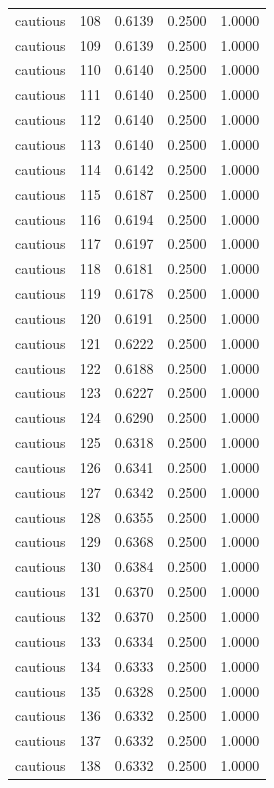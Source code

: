 \begin{tabular}{lrrrr}
cautious & 108 & 0.6139 & 0.2500 & 1.0000 \\
cautious & 109 & 0.6139 & 0.2500 & 1.0000 \\
cautious & 110 & 0.6140 & 0.2500 & 1.0000 \\
cautious & 111 & 0.6140 & 0.2500 & 1.0000 \\
cautious & 112 & 0.6140 & 0.2500 & 1.0000 \\
cautious & 113 & 0.6140 & 0.2500 & 1.0000 \\
cautious & 114 & 0.6142 & 0.2500 & 1.0000 \\
cautious & 115 & 0.6187 & 0.2500 & 1.0000 \\
cautious & 116 & 0.6194 & 0.2500 & 1.0000 \\
cautious & 117 & 0.6197 & 0.2500 & 1.0000 \\
cautious & 118 & 0.6181 & 0.2500 & 1.0000 \\
cautious & 119 & 0.6178 & 0.2500 & 1.0000 \\
cautious & 120 & 0.6191 & 0.2500 & 1.0000 \\
cautious & 121 & 0.6222 & 0.2500 & 1.0000 \\
cautious & 122 & 0.6188 & 0.2500 & 1.0000 \\
cautious & 123 & 0.6227 & 0.2500 & 1.0000 \\
cautious & 124 & 0.6290 & 0.2500 & 1.0000 \\
cautious & 125 & 0.6318 & 0.2500 & 1.0000 \\
cautious & 126 & 0.6341 & 0.2500 & 1.0000 \\
cautious & 127 & 0.6342 & 0.2500 & 1.0000 \\
cautious & 128 & 0.6355 & 0.2500 & 1.0000 \\
cautious & 129 & 0.6368 & 0.2500 & 1.0000 \\
cautious & 130 & 0.6384 & 0.2500 & 1.0000 \\
cautious & 131 & 0.6370 & 0.2500 & 1.0000 \\
cautious & 132 & 0.6370 & 0.2500 & 1.0000 \\
cautious & 133 & 0.6334 & 0.2500 & 1.0000 \\
cautious & 134 & 0.6333 & 0.2500 & 1.0000 \\
cautious & 135 & 0.6328 & 0.2500 & 1.0000 \\
cautious & 136 & 0.6332 & 0.2500 & 1.0000 \\
cautious & 137 & 0.6332 & 0.2500 & 1.0000 \\
cautious & 138 & 0.6332 & 0.2500 & 1.0000 \\

\end{tabular}
